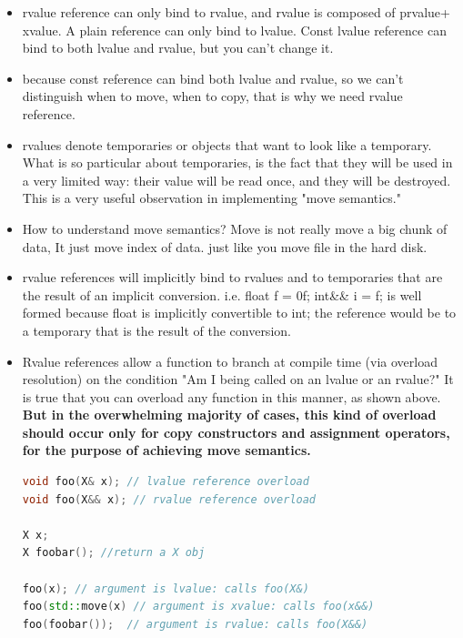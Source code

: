 \documentclass[a4paper,12pt,twoside]{book}
\begin{document}
\begin{itemize}
\item rvalue reference can only bind to rvalue, and rvalue is composed of prvalue+ xvalue. A plain reference can only bind to lvalue. Const lvalue reference can bind to both lvalue and rvalue, but you can't change it.

\item because const reference can bind both lvalue and rvalue, so we can't distinguish when to move, when to copy, that is why we need rvalue reference. 

\item rvalues denote temporaries or objects that want to look like a temporary. What is so particular about temporaries, is the fact that they will be used in a very limited way: their value will be read once, and they will be destroyed. This is a very useful observation in implementing "move semantics." 

\item How to understand move semantics? Move is not really move a big chunk of data, It just move index of data. just like you move file in the hard disk. 

\item rvalue references will implicitly bind to rvalues and to temporaries that are the result of an implicit conversion. i.e. float f = 0f; int\&\& i = f; is well formed because float is implicitly convertible to int; the reference would be to a temporary that is the result of the conversion.

\item Rvalue references allow a function to branch at compile time (via overload resolution) on the condition "Am I being called on an lvalue or an rvalue?" It is true that you can overload any function in this manner, as shown above. \textbf{But in the overwhelming majority of cases, this kind of overload should occur only for copy constructors and assignment operators, for the purpose of achieving move semantics. }

\begin{lstlisting}[frame=single, language=c++]
void foo(X& x); // lvalue reference overload
void foo(X&& x); // rvalue reference overload

X x;
X foobar(); //return a X obj

foo(x); // argument is lvalue: calls foo(X&)
foo(std::move(x) // argument is xvalue: calls foo(x&&)
foo(foobar());  // argument is rvalue: calls foo(X&&)
\end{lstlisting}



\end{itemize}
\end{document}
